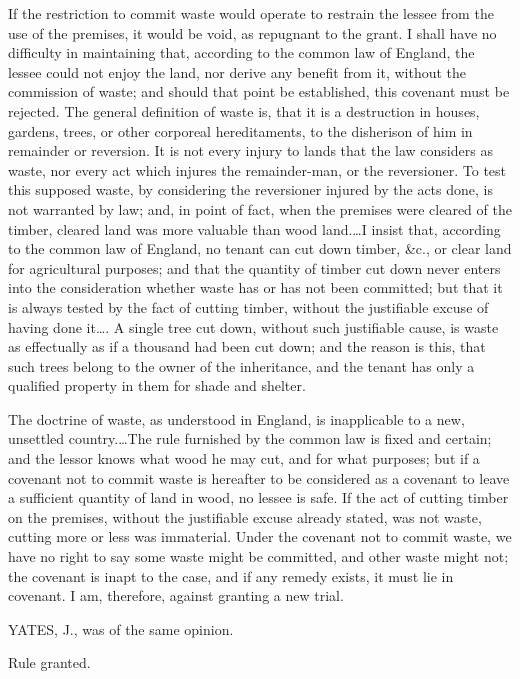 If the restriction to commit waste would operate to restrain the lessee from the
use of the premises, it would be void, as repugnant to the grant. I shall have
no difficulty in maintaining that, according to the common law of England, the
lessee could not enjoy the land, nor derive any benefit from it, without the
commission of waste; and should that point be established, this covenant must
be rejected. The general definition of waste is, that it is a destruction in
houses, gardens, trees, or other corporeal hereditaments, to the disherison of
him in remainder or reversion. It is not every injury to lands that the law
considers as waste, nor every act which injures the remainder-man, or the
reversioner. To test this supposed waste, by considering the reversioner
injured by the acts done, is not warranted by law; and, in point of fact, when
the premises were cleared of the timber, cleared land was more valuable than
wood land.\dots I insist that, according to the common law of England, no
tenant can cut down timber, \&c., or clear land for agricultural purposes; and
that the quantity of timber cut down never enters into the consideration
whether waste has or has not been committed; but that it is always tested by
the fact of cutting timber, without the justifiable excuse of having done
it\dots. A single tree cut down, without such justifiable cause, is waste as
effectually as if a thousand had been cut down; and the reason is this, that
such trees belong to the owner of the inheritance, and the tenant has only a
qualified property in them for shade and shelter.

The doctrine of waste, as understood in England, is inapplicable to a new,
unsettled country.\dots The rule furnished by the common law is fixed and
certain; and the lessor knows what wood he may cut, and for what purposes; but
if a covenant not to commit waste is hereafter to be considered as a covenant
to leave a sufficient quantity of land in wood, no lessee is safe. If the act
of cutting timber on the premises, without the justifiable excuse already
stated, was not waste, cutting more or less was immaterial. Under the covenant
not to commit waste, we have no right to say some waste might be committed, and
other waste might not; the covenant is inapt to the case, and if any remedy
exists, it must lie in covenant. I am, therefore, against granting a new trial.

YATES, J., was of the same opinion.

Rule granted.

